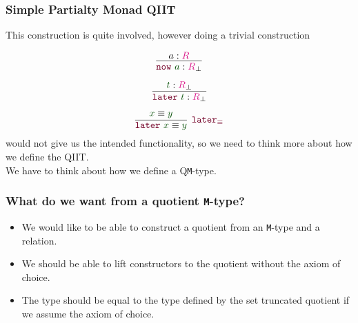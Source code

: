 \documentclass[xelatex,mathserif,serif,notheorems]{beamer} %
\theoremstyle{plain} %
\theoremstyle{definition}
\theoremstyle{remark}
\newcommand*{\term}[1]{\textcolor{green!30!black}{#1}} %
\newcommand*{\type}[1]{\textcolor{magenta!90!black}{#1}}
\newcommand*{\constructor}[1]{\textcolor{purple!60!black}{\ensuremath{\mathtt{#1}}}}
\begin{document}
\begin{frame}
  \frametitle{Simple Partialty Monad QIIT}
  This construction is quite involved, however doing a trivial construction\\[3mm]
  \strut\hfill
  \begin{minipage}{0.3\linewidth}
    \begin{equation}
      \vcenter{\infer{\constructor{now}~\term{a} : \type{R}_\bot}{a : \type{R}}}
    \end{equation}
  \end{minipage}
  \hfill
  \begin{minipage}{0.4\linewidth}
    \begin{equation}
      \vcenter{\infer{\constructor{later}~\term{t} : \type{R}_\bot}{\term{t} : \type{R}_\bot}}
    \end{equation}
  \end{minipage}
  \hfill\strut
  \begin{equation}
    \vcenter{\infer[\constructor{later_{\equiv}}]{\constructor{later}~\term{x} \equiv \term{y}}{\term{x} \equiv \term{y}}}
  \end{equation}
  would not give us the intended functionality, so we need to think more about how we define the QIIT.
  \\[3mm]
  We have to think about how we define a Q\texttt{M}-type.
\end{frame}

\begin{frame}
  \frametitle{What do we want from a quotient \texttt{M}-type?}
  \begin{itemize}
  \item We would like to be able to construct a quotient from an \texttt{M}-type and a relation.
  \item We should be able to lift constructors to the quotient without the axiom of choice.
  \item The type should be equal to the type defined by the set truncated quotient if we assume the axiom of choice.
  \end{itemize}
\end{frame}
\end{document}

